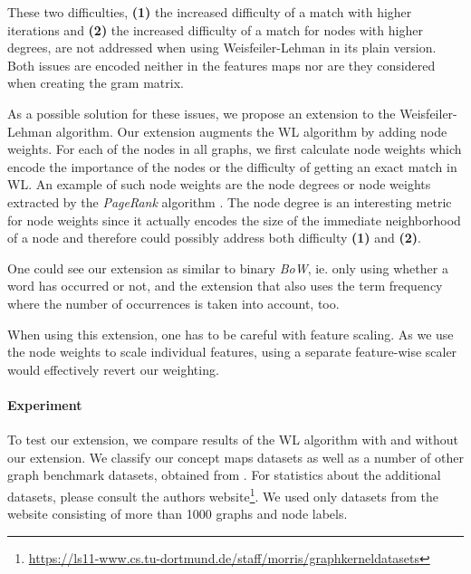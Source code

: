 These two difficulties, \textbf{(1)} the increased difficulty of a match with higher iterations and \textbf{(2)} the increased difficulty of a match for nodes with higher degrees, are not addressed when using Weisfeiler-Lehman in its plain version. Both issues are encoded neither in the features maps nor are they considered when creating the gram matrix.

As a possible solution for these issues, we propose an extension to the Weisfeiler-Lehman algorithm.
Our extension augments the WL algorithm by adding node weights.
For each of the nodes in all graphs, we first calculate node weights which encode the importance of the nodes or the difficulty of getting an exact match in WL.
An example of such node weights are the node degrees or node weights extracted by the \textit{PageRank} algorithm \cite{Page1998}.
The node degree is an interesting metric for node weights since it actually encodes the size of the immediate neighborhood of a node and therefore could possibly address both difficulty \textbf{(1)} and \textbf{(2)}.

One could see our extension as similar to binary \textit{BoW}, ie. only using whether a word has occurred or not, and the extension that also uses the term frequency where the number of occurrences is taken into account, too.

When using this extension, one has to be careful with feature scaling. As we use the node weights to scale individual features, using a separate feature-wise scaler would effectively revert our weighting.


\paragraph{Experiment}
To test our extension, we compare results of the WL algorithm with and without our extension.
We classify our concept maps datasets as well as a number of other graph benchmark datasets, obtained from \cite{Kersting2016}.
For statistics about the additional datasets, please consult the authors website\footnote{\url{https://ls11-www.cs.tu-dortmund.de/staff/morris/graphkerneldatasets}}.
We used only datasets from the website consisting of more than 1000 graphs and node labels.

